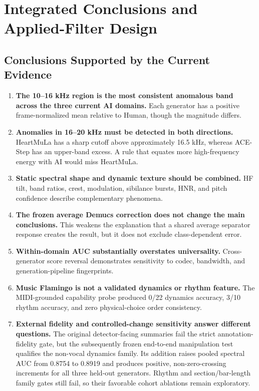 \documentclass[11pt,a4paper]{article}
\begin{document}








\section{Integrated Conclusions and Applied-Filter Design}
\label{sec:conclusion}

\subsection{Conclusions Supported by the Current Evidence}

\begin{enumerate}
  \item \textbf{The 10--16 kHz region is the most consistent anomalous band across the three current AI domains.} Each generator has a positive frame-normalized mean relative to Human, though the magnitude differs.
  \item \textbf{Anomalies in 16--20 kHz must be detected in both directions.} HeartMuLa has a sharp cutoff above approximately 16.5 kHz, whereas ACE-Step has an upper-band excess. A rule that equates more high-frequency energy with AI would miss HeartMuLa.
  \item \textbf{Static spectral shape and dynamic texture should be combined.} HF tilt, band ratios, crest, modulation, sibilance bursts, HNR, and pitch confidence describe complementary phenomena.
  \item \textbf{The frozen average Demucs correction does not change the main conclusions.} This weakens the explanation that a shared average separator response creates the result, but it does not exclude class-dependent error.
  \item \textbf{Within-domain AUC substantially overstates universality.} Cross-generator score reversal demonstrates sensitivity to codec, bandwidth, and generation-pipeline fingerprints.
  \item \textbf{Music Flamingo is not a validated dynamics or rhythm feature.} The MIDI-grounded capability probe produced 0/22 dynamics accuracy, 3/10 rhythm accuracy, and zero physical-choice order consistency.
  \item \textbf{External fidelity and controlled-change sensitivity answer different questions.} The original detector-facing summaries fail the strict annotation-fidelity gate, but the subsequently frozen end-to-end manipulation test qualifies the non-vocal dynamics family. Its addition raises pooled spectral AUC from 0.8754 to 0.8919 and produces positive, non-zero-crossing increments for all three held-out generators. Rhythm and section/bar-length family gates still fail, so their favorable cohort ablations remain exploratory.
\end{enumerate}
\end{document}
